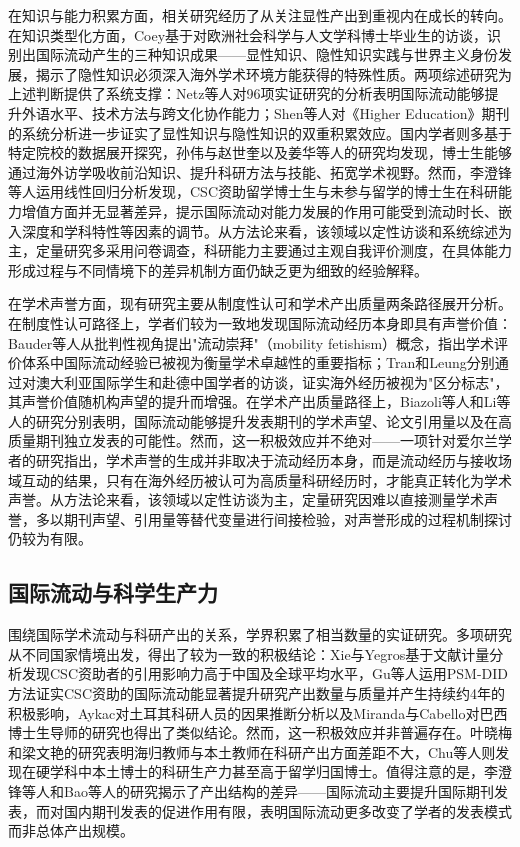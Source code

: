 在知识与能力积累方面，相关研究经历了从关注显性产出到重视内在成长的转向。在知识类型化方面，Coey基于对欧洲社会科学与人文学科博士毕业生的访谈，识别出国际流动产生的三种知识成果------显性知识、隐性知识实践与世界主义身份发展，揭示了隐性知识必须深入海外学术环境方能获得的特殊性质\cite{coey2018}。两项综述研究为上述判断提供了系统支撑：Netz等人对96项实证研究的分析表明国际流动能够提升外语水平、技术方法与跨文化协作能力\cite{netz2020}；Shen等人对《Higher Education》期刊的系统分析进一步证实了显性知识与隐性知识的双重积累效应\cite{shen2022}。国内学者则多基于特定院校的数据展开探究，孙伟与赵世奎\cite{sunwei2017}以及姜华等人\cite{jianghua2023}的研究均发现，博士生能够通过海外访学吸收前沿知识、提升科研方法与技能、拓宽学术视野。然而，李澄锋等人运用线性回归分析发现，CSC资助留学博士生与未参与留学的博士生在科研能力增值方面并无显著差异\cite{lichengfeng2020}，提示国际流动对能力发展的作用可能受到流动时长、嵌入深度和学科特性等因素的调节。从方法论来看，该领域以定性访谈和系统综述为主，定量研究多采用问卷调查，科研能力主要通过主观自我评价测度，在具体能力形成过程与不同情境下的差异机制方面仍缺乏更为细致的经验解释。

在学术声誉方面，现有研究主要从制度性认可和学术产出质量两条路径展开分析。在制度性认可路径上，学者们较为一致地发现国际流动经历本身即具有声誉价值：Bauder等人从批判性视角提出"流动崇拜"（mobility fetishism）概念，指出学术评价体系中国际流动经验已被视为衡量学术卓越性的重要指标\cite{bauder2017}；Tran\cite{tran2016}和Leung\cite{leung2013}分别通过对澳大利亚国际学生和赴德中国学者的访谈，证实海外经历被视为"区分标志"，其声誉价值随机构声望的提升而增强。在学术产出质量路径上，Biazoli等人\cite{biazoli2025}和Li等人\cite{li2025}的研究分别表明，国际流动能够提升发表期刊的学术声望、论文引用量以及在高质量期刊独立发表的可能性。然而，这一积极效应并不绝对------一项针对爱尔兰学者的研究指出，学术声誉的生成并非取决于流动经历本身，而是流动经历与接收场域互动的结果，只有在海外经历被认可为高质量科研经历时，才能真正转化为学术声誉\cite{courtois2024}。从方法论来看，该领域以定性访谈为主，定量研究因难以直接测量学术声誉，多以期刊声望、引用量等替代变量进行间接检验，对声誉形成的过程机制探讨仍较为有限。

\subsection{国际流动与科学生产力}

围绕国际学术流动与科研产出的关系，学界积累了相当数量的实证研究。多项研究从不同国家情境出发，得出了较为一致的积极结论：Xie与Yegros基于文献计量分析发现CSC资助者的引用影响力高于中国及全球平均水平\cite{xie2025}，Gu等人运用PSM-DID方法证实CSC资助的国际流动能显著提升研究产出数量与质量并产生持续约4年的积极影响\cite{gu2024}，Aykac对土耳其科研人员的因果推断分析\cite{aykac2021}以及Miranda与Cabello对巴西博士生导师的研究\cite{grochocki2022}也得出了类似结论。然而，这一积极效应并非普遍存在。叶晓梅和梁文艳的研究表明海归教师与本土教师在科研产出方面差距不大\cite{yexiaomei2019}，Chu等人则发现在硬学科中本土博士的科研生产力甚至高于留学归国博士\cite{chu2024}。值得注意的是，李澄锋等人\cite{lichengfeng2020}和Bao等人\cite{bao2023}的研究揭示了产出结构的差异------国际流动主要提升国际期刊发表，而对国内期刊发表的促进作用有限，表明国际流动更多改变了学者的发表模式而非总体产出规模。

